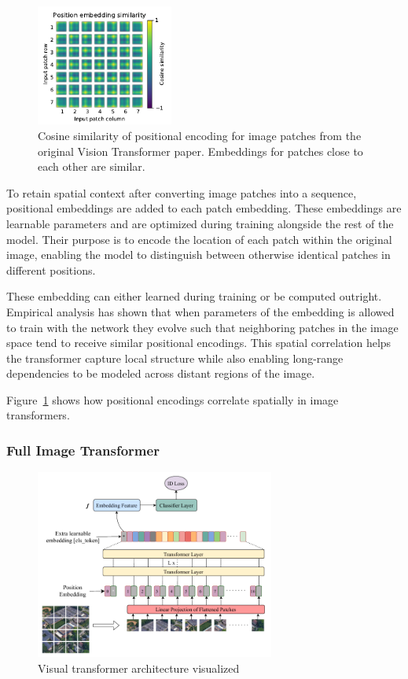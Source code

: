 \documentclass{pracalicmgr}
\begin{document}
\begin{figure}[h]
    \centering
    \includegraphics[width=0.4\textwidth]{src/imNetEncodings.pdf}
    \caption{Cosine similarity of positional encoding for image patches from the original Vision Transformer paper. Embeddings for patches close to each other are similar\cite{ViT}.}
    \label{fig:imNetEncodings}
\end{figure}

To retain spatial context after converting image patches into a sequence, positional embeddings are added to each patch embedding. These embeddings are learnable parameters and are optimized during training alongside the rest of the model. Their purpose is to encode the location of each patch within the original image, enabling the model to distinguish between otherwise identical patches in different positions.

These embedding can either learned during training or be computed outright. Empirical analysis has shown that when parameters of the embedding is allowed to train with the network they evolve such that neighboring patches in the image space tend to receive similar positional encodings. This spatial correlation helps the transformer capture local structure while also enabling long-range dependencies to be modeled across distant regions of the image.

Figure~\ref{fig:imNetEncodings} shows how positional encodings correlate spatially in image transformers.

\subsubsection{Full Image Transformer}

\begin{figure}[H]
    \centering
    \includegraphics[width=0.7\textwidth]{src/visNet.pdf}
    \caption{Visual transformer architecture visualized\cite{ViTFUllGraph}}
    \label{fig:visNetArch}
\end{figure}
\end{document}
